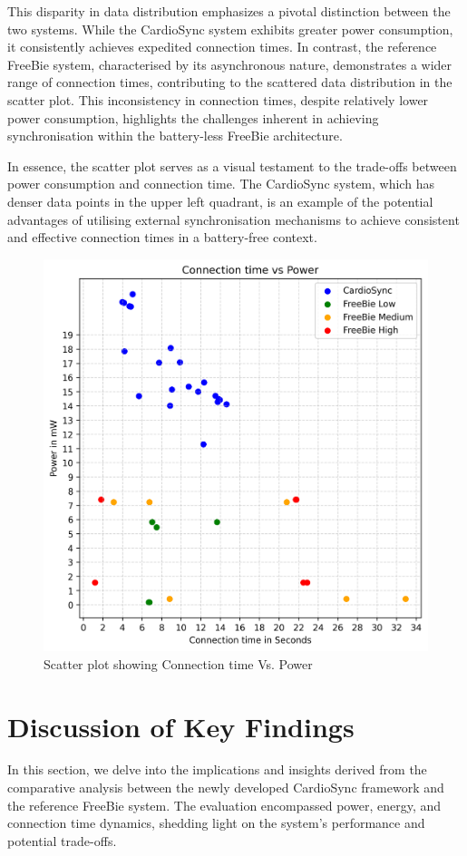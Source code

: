 This disparity in data distribution emphasizes a pivotal distinction between the two systems. While the CardioSync system exhibits greater power consumption, it consistently achieves expedited connection times. In contrast, the reference FreeBie system, characterised by its asynchronous nature, demonstrates a wider range of connection times, contributing to the scattered data distribution in the scatter plot. This inconsistency in connection times, despite relatively lower power consumption, highlights the challenges inherent in achieving synchronisation within the battery-less FreeBie architecture.

In essence, the scatter plot serves as a visual testament to the trade-offs between power consumption and connection time. The CardioSync system, which has denser data points in the upper left quadrant, is an example of the potential advantages of utilising external synchronisation mechanisms to achieve consistent and effective connection times in a battery-free context.

\begin{figure}[H]
    \centering
    \includegraphics[width=0.7\linewidth]{chapters/Results/Scatter_plot.png}
    \caption{Scatter plot showing Connection time Vs. Power}
    \label{fig:scatter_conn_power}
\end{figure}

\section{Discussion of Key Findings}
In this section, we delve into the implications and insights derived from the comparative analysis between the newly developed CardioSync framework and the reference FreeBie system. The evaluation encompassed power, energy, and connection time dynamics, shedding light on the system's performance and potential trade-offs.

